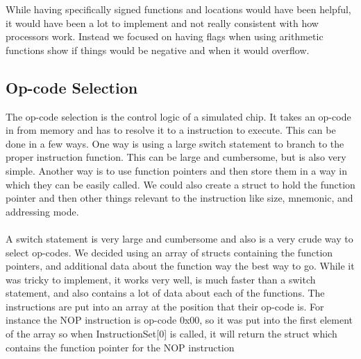 \documentclass[conference]{IEEEtran}
\begin{document}
While having specifically signed functions and locations would have been helpful, it would have been a lot to implement and not really consistent with how processors work. Instead we focused on having flags when using arithmetic functions show if things would be negative and when it would overflow.

\subsection{Op-code Selection}

The op-code selection is the control logic of a simulated chip. It takes an op-code in from memory and has to resolve it to a instruction to execute. This can be done in a few ways. One way is using a large switch statement to branch to the proper instruction function. This can be large and cumbersome, but is also very simple. Another way is to use function pointers and then store them in a way in which they can be easily called. We could also create a struct to hold the function pointer and then other things relevant to the instruction like size, mnemonic, and addressing mode.\\

\\

A switch statement is very large and cumbersome and also is a very crude way to select op-codes. We decided using an array of structs containing the function pointers, and additional data about the function way the best way to go. While it was tricky to implement, it works very well, is much faster than a switch statement, and also contains a lot of data about each of the functions. The instructions are put into an array at the position that their op-code is. For instance the NOP instruction is op-code 0x00, so it was put into the first element of the array so when InstructionSet[0] is called, it will return the struct which contains the function pointer for the NOP instruction
\end{document}
